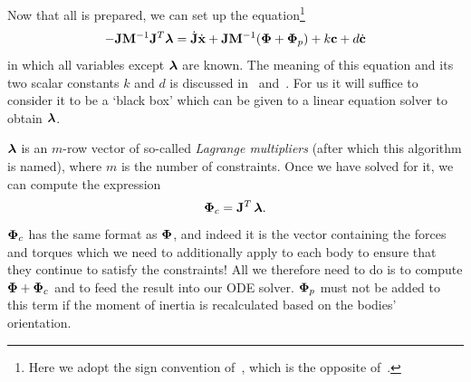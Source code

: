 Now that all is prepared, we can set up the equation\footnote{Here we adopt the sign convention
of~\cite{BaraffWitkin:97}, which is the opposite of~\cite{Saunders:PhD}.}
\begin{equation}
\label{lagrangeEquation}
-\m{J}\m{M}^{-1}\m{J}^T\ve{\lambda} = \dot{\m{J}}\dot{\ve{x}} +
    \m{J}\m{M}^{-1}(\ve{\Phi} + \ve{\Phi}_p) + k\ve{c} + d\dot{\ve{c}}
\end{equation}
in which all variables except $\ve{\lambda}$ are known. The meaning of this equation and
its two scalar constants $k$ and $d$ is discussed in~\cite{BaraffWitkin:97}
and~\cite{Saunders:PhD}. For us it will suffice to consider it to be a `black box' which can be
given to a linear equation solver to obtain $\ve{\lambda}$.

$\ve{\lambda}$ is an $m$-row vector of so-called \emph{Lagrange multipliers} (after which this
algorithm is named), where $m$ is the number of constraints. Once we have solved for it, we can
compute the expression
\begin{equation} \label{lagrangeSolution}
\ve{\Phi}_c = \m{J}^T\,\ve{\lambda}.
\end{equation}
$\ve{\Phi}_c$ has the same format as $\ve{\Phi}$, and indeed it is the vector containing
the forces and torques which we need to additionally apply to each body to ensure that they
continue to satisfy the constraints! All we therefore need to do is to compute
$\ve{\Phi} + \ve{\Phi}_c$ and to feed the result into our ODE solver. $\ve{\Phi}_p$ must not
be added to this term if the moment of inertia is recalculated based on the bodies' orientation.
